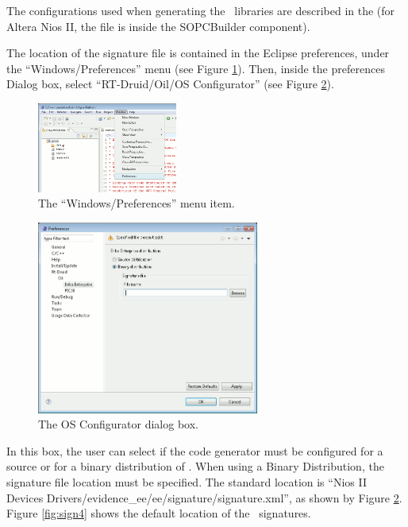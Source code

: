 The configurations used when generating the \ee\ libraries are
described in the  (for Altera Nios
II, the file is inside the  SOPCBuilder component).

The location of the signature file is contained in the Eclipse
preferences, under the ``Windows/Preferences'' menu (see Figure
\ref{fig:sign1}). Then, inside the preferences Dialog box, select
``RT-Druid/Oil/OS Configurator'' (see Figure \ref{fig:sign2}).

\begin{figure}
  \begin{center}
    \includegraphics[width=4.6cm, bb=0 0 596 383]{images/sign1.png}
  \end{center}
  \caption{The ``Windows/Preferences'' menu item.}
  \label{fig:sign1}
\end{figure}

\begin{figure}
  \begin{center}
    \includegraphics[width=7.3cm, bb=0 0 635 552]{images/sign2.png}
  \end{center}
  \caption{The OS Configurator dialog box.}
  \label{fig:sign2}
\end{figure}

In this box, the user can select if the code generator must be
configured for a source or for a binary distribution of \ee. When
using a Binary Distribution, the signature file location must be
specified. The standard location is ``Nios II Devices
Drivers/evidence\_ee/ee/signature/signature.xml'', as shown by Figure
\ref{fig:sign2}. Figure \ref{fig:sign4} shows the default location of
the \ee\ signatures.

